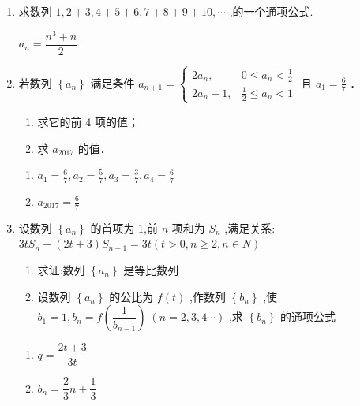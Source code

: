 \begin{enumerate}
    \item 求数列 $1,2 + 3,4 + 5 + 6,7 + 8 + 9 + {10},\cdots$ ,的一个通项公式.
    \begin{jieda}
        $a_n = \dfrac{n^3+n}{2}$
    \end{jieda}

    \item 若数列 $\left\{a_n\right\}$ 满足条件 $a_{n+1}=\left\{\begin{array}{ll}2 a_n, & 0 \leq a_n<\frac{1}{2} \\ 2 a_n-1, & \frac{1}{2} \leq a_n<1\end{array}\right.$ 且 $a_1=\frac{6}{7}$ ．
    \begin{enumerate}
        \item 求它的前 4 项的值；
        \item 求 $a_{2017}$ 的值．
    \end{enumerate}
    \begin{jieda}
        \begin{enumerate}
            \item $a_1=\frac{6}{7}, a_2=\frac{5}{7}, a_3=\frac{3}{7}, a_4=\frac{6}{7}$
            \item $a_{2017}=\frac{6}{7}$
        \end{enumerate}
    \end{jieda}




    \item 设数列 $\left\{  {a}_{n}\right\}$ 的首项为 1,前 $n$ 项和为 ${S}_{n}$ ,满足关系: ${3t}{S}_{n} - \left( {{2t} + 3}\right) {S}_{n - 1} = {3t}\left( {t > 0,n \geq  2,n \in  N}\right)$  
    \begin{enumerate}
        \item 求证:数列 $\left\{  {a}_{n}\right\}$ 是等比数列
        \item 设数列 $\left\{  {a}_{n}\right\}$ 的公比为 $f\left( t\right)$ ,作数列 $\left\{  {b}_{n}\right\}$ ,使 ${b}_{1} = 1,{b}_{n} = f\left( \dfrac{1}{{b}_{n - 1}}\right) \;\left( {n = 2,3,4\cdots }\right)$ ,求 $\left\{  {b}_{n}\right\}$ 的通项公式
    \end{enumerate}
    \begin{jieda}
        \begin{enumerate}
            \item $q = \dfrac{2t+3}{3t}$
            \item $b_n = \dfrac{2}{3}n+\dfrac{1}{3}$
        \end{enumerate}
    \end{jieda}
    

\end{enumerate}
